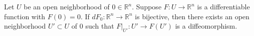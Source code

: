 Let $U$ be an open neighborhood of $0 \in \mathbb{R}^n$. Suppose $F: U \to \mathbb{R}^n$ is a differentiable function with $F(0) = 0$. If $dF_0: \mathbb{R}^n \to \mathbb{R}^n$ is bijective, then there exists an open neighborhood $U' \subset U$ of $0$ such that $F|_{U'}: U' \to F(U')$ is a diffeomorphism.